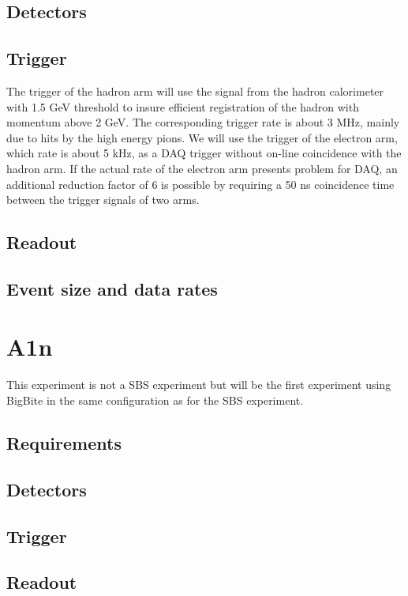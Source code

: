 \documentclass{article}
\begin{document}
\subsection{Detectors}


\subsection{Trigger}
The trigger of the hadron arm will use the signal from the hadron calorimeter with 1.5 GeV
threshold to insure efficient registration of the hadron with momentum above 2 GeV. The
corresponding trigger rate is about 3 MHz, mainly due to hits by the high energy pions.
We will use the trigger of the electron arm, which rate is about 5 kHz, as a DAQ trigger
without on-line coincidence with the hadron arm. If the actual rate of the electron arm
presents problem for DAQ, an additional reduction factor of 6 is possible by requiring a
50 ns coincidence time between the trigger signals of two arms.


\subsection{Readout}

\subsection{Event size and data rates}
\section{A1n}
This experiment is not a SBS experiment but will be the first experiment using BigBite in the
same configuration as for the SBS experiment.

\subsection{Requirements}
\subsection{Detectors}
\subsection{Trigger}

\subsection{Readout}
\end{document}
